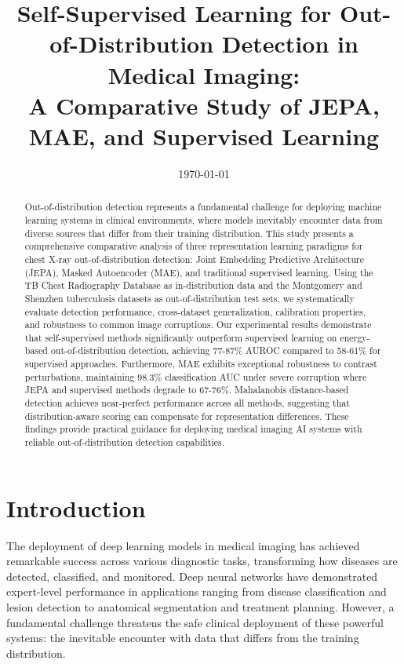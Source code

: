 \documentclass[11pt,a4paper]{article}
\title{Self-Supervised Learning for Out-of-Distribution Detection in Medical Imaging:\\A Comparative Study of JEPA, MAE, and Supervised Learning}
\author{}
\date{\today}
\begin{document}
\maketitle

\begin{abstract}
Out-of-distribution detection represents a fundamental challenge for deploying machine learning systems in clinical environments, where models inevitably encounter data from diverse sources that differ from their training distribution. This study presents a comprehensive comparative analysis of three representation learning paradigms for chest X-ray out-of-distribution detection: Joint Embedding Predictive Architecture (JEPA), Masked Autoencoder (MAE), and traditional supervised learning. Using the TB Chest Radiography Database as in-distribution data and the Montgomery and Shenzhen tuberculosis datasets as out-of-distribution test sets, we systematically evaluate detection performance, cross-dataset generalization, calibration properties, and robustness to common image corruptions. Our experimental results demonstrate that self-supervised methods significantly outperform supervised learning on energy-based out-of-distribution detection, achieving 77-87\% AUROC compared to 58-61\% for supervised approaches. Furthermore, MAE exhibits exceptional robustness to contrast perturbations, maintaining 98.3\% classification AUC under severe corruption where JEPA and supervised methods degrade to 67-76\%. Mahalanobis distance-based detection achieves near-perfect performance across all methods, suggesting that distribution-aware scoring can compensate for representation differences. These findings provide practical guidance for deploying medical imaging AI systems with reliable out-of-distribution detection capabilities.
\end{abstract}

\section{Introduction}

The deployment of deep learning models in medical imaging has achieved remarkable success across various diagnostic tasks, transforming how diseases are detected, classified, and monitored. Deep neural networks have demonstrated expert-level performance in applications ranging from disease classification and lesion detection to anatomical segmentation and treatment planning. However, a fundamental challenge threatens the safe clinical deployment of these powerful systems: the inevitable encounter with data that differs from the training distribution.
\end{document}
